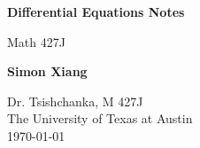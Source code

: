 \documentclass{article}
\begin{document}
\begin{titlepage}
    \begin{center}
        \vspace*{1cm}
 
        \Huge
        \textbf{Differential Equations Notes}
 
        \vspace{0.5cm}
        \LARGE
        Math 427J

        \vspace{1.5cm}
 
        \textbf{Simon Xiang}
 
        \vfill
  
        \vspace{0.8cm}
 
        \Large
    	Dr. Tsishchanka, M 427J\\
        The University of Texas at Austin\\
        \today
 
    \end{center}
\end{titlepage}
    
\end{document}
